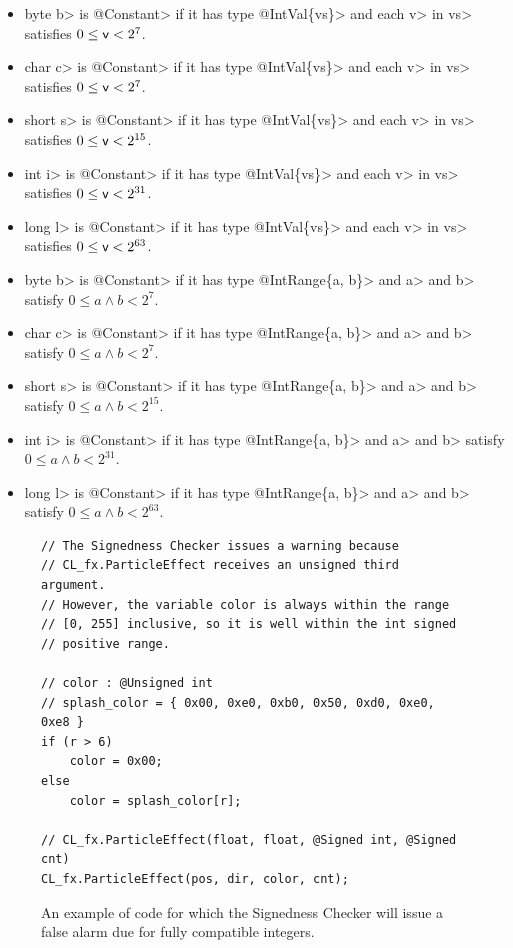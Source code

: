 \begin{itemize}
\item \<byte b> is \<@Constant> if it has type \<@IntVal\{vs\}> and each
\<v> in \<vs> satisfies $0 \leq \<v> < 2^7$.
\item \<char c> is \<@Constant> if it has type \<@IntVal\{vs\}> and each
\<v> in \<vs> satisfies $0 \leq \<v> < 2^7$.
\item \<short s> is \<@Constant> if it has type \<@IntVal\{vs\}> and each
\<v> in \<vs> satisfies $0 \leq \<v> < 2^{15}$.
\item \<int i> is \<@Constant> if it has type \<@IntVal\{vs\}> and each
\<v> in \<vs> satisfies $0 \leq \<v> < 2^{31}$.
\item \<long l> is \<@Constant> if it has type \<@IntVal\{vs\}> and each
\<v> in \<vs> satisfies $0 \leq \<v> < 2^{63}$.
\item \<byte b> is \<@Constant> if it has type \<@IntRange\{a, b\}> and
\<a> and \<b> satisfy $0 \leq a \land b < 2^7$.
\item \<char c> is \<@Constant> if it has type \<@IntRange\{a, b\}> and
\<a> and \<b> satisfy $0 \leq a \land b < 2^7$.
\item \<short s> is \<@Constant> if it has type \<@IntRange\{a, b\}> and
\<a> and \<b> satisfy $0 \leq a \land b < 2^{15}$.
\item \<int i> is \<@Constant> if it has type \<@IntRange\{a, b\}> and
\<a> and \<b> satisfy $0 \leq a \land b < 2^{31}$.
\item \<long l> is \<@Constant> if it has type \<@IntRange\{a, b\}> and
\<a> and \<b> satisfy $0 \leq a \land b < 2^{63}$.
\end{itemize}

\begin{figure}
\begin{lstlisting}
// The Signedness Checker issues a warning because
// CL_fx.ParticleEffect receives an unsigned third argument.
// However, the variable color is always within the range
// [0, 255] inclusive, so it is well within the int signed
// positive range.

// color : @Unsigned int
// splash_color = { 0x00, 0xe0, 0xb0, 0x50, 0xd0, 0xe0, 0xe8 }
if (r > 6)
    color = 0x00;
else
    color = splash_color[r];

// CL_fx.ParticleEffect(float, float, @Signed int, @Signed cnt)
CL_fx.ParticleEffect(pos, dir, color, cnt);
\end{lstlisting}
\caption{An example of code for which the Signedness Checker will issue a false
alarm due for fully compatible integers.}
\label{fig:compatible}
\end{figure}

